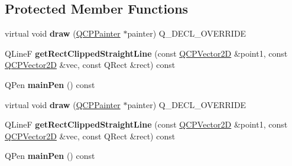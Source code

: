 \subsection*{Protected Member Functions}
\begin{DoxyCompactItemize}
\item 
virtual void {\bfseries draw} (\hyperlink{class_q_c_p_painter}{Q\+C\+P\+Painter} $\ast$painter) Q\+\_\+\+D\+E\+C\+L\+\_\+\+O\+V\+E\+R\+R\+I\+DE\hypertarget{class_q_c_p_item_straight_line_acbc84ad219bf4845152e4e2202fcaa3c}{}\label{class_q_c_p_item_straight_line_acbc84ad219bf4845152e4e2202fcaa3c}

\item 
Q\+LineF {\bfseries get\+Rect\+Clipped\+Straight\+Line} (const \hyperlink{class_q_c_p_vector2_d}{Q\+C\+P\+Vector2D} \&point1, const \hyperlink{class_q_c_p_vector2_d}{Q\+C\+P\+Vector2D} \&vec, const Q\+Rect \&rect) const \hypertarget{class_q_c_p_item_straight_line_a071f5b981adc2b9de103fb691001e317}{}\label{class_q_c_p_item_straight_line_a071f5b981adc2b9de103fb691001e317}

\item 
Q\+Pen {\bfseries main\+Pen} () const \hypertarget{class_q_c_p_item_straight_line_a63ef39814c5b560dbb7b13e3fec1d940}{}\label{class_q_c_p_item_straight_line_a63ef39814c5b560dbb7b13e3fec1d940}

\item 
virtual void {\bfseries draw} (\hyperlink{class_q_c_p_painter}{Q\+C\+P\+Painter} $\ast$painter) Q\+\_\+\+D\+E\+C\+L\+\_\+\+O\+V\+E\+R\+R\+I\+DE\hypertarget{class_q_c_p_item_straight_line_ae4777141c4514e0e33103bd38b2679a4}{}\label{class_q_c_p_item_straight_line_ae4777141c4514e0e33103bd38b2679a4}

\item 
Q\+LineF {\bfseries get\+Rect\+Clipped\+Straight\+Line} (const \hyperlink{class_q_c_p_vector2_d}{Q\+C\+P\+Vector2D} \&point1, const \hyperlink{class_q_c_p_vector2_d}{Q\+C\+P\+Vector2D} \&vec, const Q\+Rect \&rect) const \hypertarget{class_q_c_p_item_straight_line_a071f5b981adc2b9de103fb691001e317}{}\label{class_q_c_p_item_straight_line_a071f5b981adc2b9de103fb691001e317}

\item 
Q\+Pen {\bfseries main\+Pen} () const \hypertarget{class_q_c_p_item_straight_line_a63ef39814c5b560dbb7b13e3fec1d940}{}\label{class_q_c_p_item_straight_line_a63ef39814c5b560dbb7b13e3fec1d940}

\end{DoxyCompactItemize}
